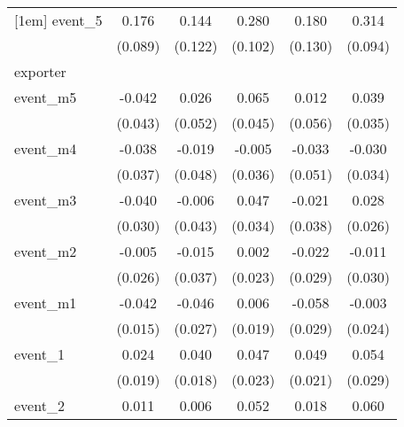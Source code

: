 {\begin{tabular}{l*{5}{c}}
[1em]
event\_5     &       0.176\sym{*}  &       0.144         &       0.280\sym{**} &       0.180         &       0.314\sym{***}\\
            &     (0.089)         &     (0.122)         &     (0.102)         &     (0.130)         &     (0.094)         \\
\hline
exporter    &                     &                     &                     &                     &                     \\
event\_m5    &      -0.042         &       0.026         &       0.065         &       0.012         &       0.039         \\
            &     (0.043)         &     (0.052)         &     (0.045)         &     (0.056)         &     (0.035)         \\
[1em]
event\_m4    &      -0.038         &      -0.019         &      -0.005         &      -0.033         &      -0.030         \\
            &     (0.037)         &     (0.048)         &     (0.036)         &     (0.051)         &     (0.034)         \\
[1em]
event\_m3    &      -0.040         &      -0.006         &       0.047         &      -0.021         &       0.028         \\
            &     (0.030)         &     (0.043)         &     (0.034)         &     (0.038)         &     (0.026)         \\
[1em]
event\_m2    &      -0.005         &      -0.015         &       0.002         &      -0.022         &      -0.011         \\
            &     (0.026)         &     (0.037)         &     (0.023)         &     (0.029)         &     (0.030)         \\
[1em]
event\_m1    &      -0.042\sym{**} &      -0.046         &       0.006         &      -0.058\sym{*}  &      -0.003         \\
            &     (0.015)         &     (0.027)         &     (0.019)         &     (0.029)         &     (0.024)         \\
[1em]
event\_1     &       0.024         &       0.040\sym{*}  &       0.047\sym{*}  &       0.049\sym{*}  &       0.054         \\
            &     (0.019)         &     (0.018)         &     (0.023)         &     (0.021)         &     (0.029)         \\
[1em]
event\_2     &       0.011         &       0.006         &       0.052\sym{*}  &       0.018         &       0.060\sym{*}  \\

\end{tabular}}
